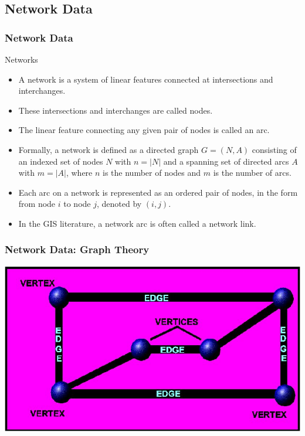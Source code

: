 \documentclass[nototal,handout]{beamer}
\begin{document}
  \subsection{Network Data}
\begin{frame}[<+->]
  \frametitle{Network Data}
  \begin{block}{Networks} \begin{itemize} \item 	 A network is a system
      of linear features connected at intersections and interchanges.  \item
      These intersections and interchanges are called nodes.  \item 	The
      linear feature connecting any given pair of nodes is called an arc.
    \item 	Formally, a network is defined as a directed graph $G = (N,
      A)$ consisting of an indexed set of nodes $N$ with $n = |N|$ and a spanning
      set of directed arcs $A$ with $m = |A|$, where $n$ is the number of nodes and
      $m$ is the number of arcs.
  \item 	 Each arc on a network is represented as an ordered pair of
    nodes, in the form from node $i$ to node $j$, denoted by $(i, j)$.
  \item 	In the GIS literature, a network arc is often called a network link.
    \end{itemize}
   \end{block}
 \end{frame}

\begin{frame}
    \frametitle{Network Data: Graph Theory}
    \begin{center}
     \includegraphics[width=.65\linewidth]{graph.jpg}
   \end{center}
\end{frame}
\end{document}
